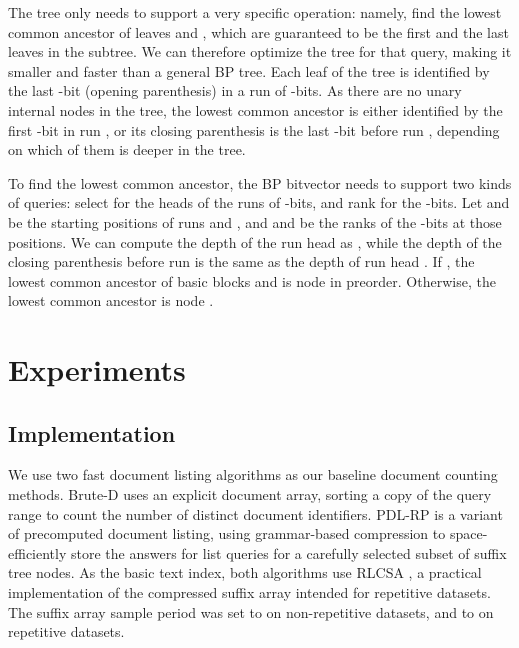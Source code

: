\documentclass[11pt]{llncs}
\newcommand{\rank}{\textsf{rank}}
\newcommand{\select}{\textsf{select}}
\newcommand{\doclist}{\textsf{list}}
\newcommand{\BruteD}{\textsf{Brute-D}}
\newcommand{\PDLRP}{\textsf{PDL-RP}}
\newcommand{\onebit}{\nobreakdash-bit}
\newcommand{\zerobit}{\nobreakdash-bit}
\begin{document}
The tree only needs to support a very specific operation: namely, find the lowest common ancestor of leaves  and , which are guaranteed to be the first and the last leaves in the subtree. We can therefore optimize the tree for that query, making it smaller and faster than a general BP tree. Each leaf of the tree is identified by the last \onebit{} (opening parenthesis) in a run of \onebit{}s. As there are no unary internal nodes in the tree, the lowest common ancestor is either identified by the first \onebit{} in run , or its closing parenthesis is the last \zerobit{} before run , depending on which of them is deeper in the tree.

To find the lowest common ancestor, the BP bitvector needs to support two kinds of queries: \select{} for the heads of the runs of \onebit{}s, and \rank{} for the \onebit{}s. Let  and  be the starting positions of runs  and , and  and  be the ranks of the \onebit{}s at those positions. We can compute the depth of the run head  as , while the depth of the closing parenthesis before run  is the same as the depth of run head . If , the lowest common ancestor of basic blocks  and  is node  in preorder. Otherwise, the lowest common ancestor is node .


\section{Experiments}\label{section:experiments}

\subsection{Implementation}

We use two fast document listing algorithms as our baseline document counting methods. \BruteD{} uses an explicit document array, sorting a copy of the query range  to count the number of distinct document identifiers. \PDLRP{} \cite{NPS2014} is a variant of precomputed document listing, using grammar-based compression to space-efficiently store the answers for \doclist{} queries for a carefully selected subset of suffix tree nodes. As the basic text index, both algorithms use RLCSA \cite{Maekinen2010}, a practical implementation of the compressed suffix array intended for repetitive datasets. The suffix array sample period was set to  on non-repetitive datasets, and to  on repetitive datasets.
\end{document}
